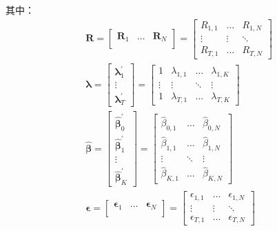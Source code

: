 \documentclass[11pt]{article}
\begin{document}
其中：
\begin{gather*}
    \bm{R} = \begin{bmatrix} \bm{R}_1 & \dots & \bm{R}_N \\ \end{bmatrix}
    = \begin{bmatrix} R_{1,1} & \dots & R_{1,N} \\ \vdots & \vdots & \ddots \\ R_{T,1} & \dots & R_{T,N} \end{bmatrix} \\
    \bm{\lambda} = \begin{bmatrix} \bm{\lambda}_{1}^{'} \\ \vdots \\ \bm{\lambda}_{T}^{'} \end{bmatrix}
    = \begin{bmatrix} 1 & \lambda_{1,1} & \dots & \lambda_{1,K} \\ \vdots & \vdots & \ddots & \vdots \\ 1 & \lambda_{T,1} & \dots & \lambda_{T,K} \end{bmatrix} 
    \\
    \hat{\bm{\beta}}
    = \begin{bmatrix} \bm{\hat{\beta}}_{0}^{'} \\ \bm{\hat{\beta}}_{1}^{'} \\ \vdots \\ \bm{\hat{\beta}}_{K}^{'} \end{bmatrix}
    = \begin{bmatrix} \hat{\beta}_{0,1} & \dots & \hat{\beta}_{0,N} \\ \hat{\beta}_{1,1} & \dots & \hat{\beta}_{1,N} \\ \vdots & \ddots & \vdots \\ \hat{\beta}_{K,1} & \dots & \hat{\beta}_{K,N} \end{bmatrix}
    \\
    \bm{\epsilon} = \begin{bmatrix}
        \bm{\epsilon}_1 & \dots & \bm{\epsilon}_N \\
    \end{bmatrix}
    = \begin{bmatrix} \epsilon_{1,1} & \dots & \epsilon_{1,N} \\ \vdots & \vdots & \ddots \\ \epsilon_{T,1} & \dots & \epsilon_{T,N} \end{bmatrix}
\end{gather*}
\end{document}
